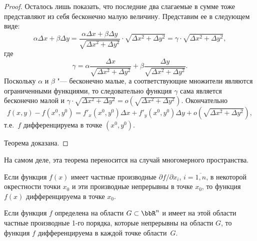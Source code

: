 \begin{proof}
Осталось лишь показать, что последние два слагаемые в сумме тоже представляют из себя бесконечно малую величину. Представим ее в следующем виде:
$$
\alpha \Delta x + \beta \Delta y = \frac{\alpha \Delta x + \beta \Delta y}{\sqrt{\Delta x^2 + \Delta y^2}} \cdot \sqrt{\Delta x^2 + \Delta y^2} = \gamma \cdot \sqrt{\Delta x^2 + \Delta y^2},
$$
где
$$
\gamma = \alpha \frac{\Delta x}{\sqrt{\Delta x^2 + \Delta y^2}} + \beta \frac{\Delta y}{\sqrt{\Delta x^2 + \Delta y^2}}.
$$
Поскольку $\alpha$ и $\beta$ "--- бесконечно малые, а соответствующие множители являются ограниченными функциями, то следовательно функция $\gamma$ сама является бесконечно малой и $\gamma \cdot \sqrt{\Delta x^2 + \Delta y^2} = o(\sqrt{\Delta x^2 + \Delta y^2})$. Окончательно
$$
f(x,y) - f(x^0, y^0) = f'_x(x^0, y^0) \Delta x + f'_y(x^0, y^0) \Delta y + o(\sqrt{\Delta x^2 + \Delta y^2}),
$$
т.е.~$f$ дифференцируема в точке $(x^0, y^0)$.

Теорема доказана.
\end{proof}

На самом деле, эта теорема переносится на случай многомерного пространства.
\begin{thmn}
Если функция $f(x)$ имеет частные производные $\partial f /\partial x_i$, $i=\overline{1,n}$, в некоторой окрестности точки $x_0$ и эти производные непрерывны в точке $x_0$, то функция $f(x)$ дифференцируема в точке $x_0$.
\end{thmn}
\begin{cons}
Если функция $f$ определена на области $G \subset \bbR^n$ и имеет на этой области частные производные 1-го порядка, которые непрерывны на области $G$, то функция $f$ дифференцируема в каждой точке области~$G$.
\end{cons}
